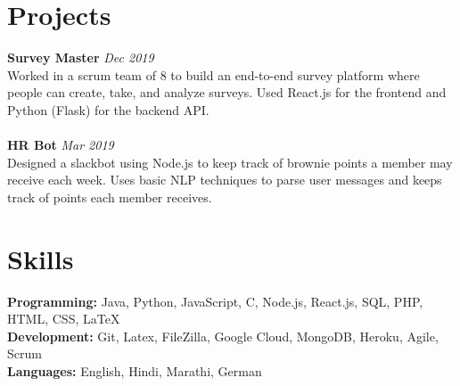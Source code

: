 \documentclass[margin,line]{resume}
\begin{document}
\begin{resume}
    \section{\mysidestyle Projects}

    \textbf{Survey Master} \hfill \textsl{Dec 2019}
    \\
    Worked in a scrum team of 8 to build an end-to-end survey platform where people can create, take, and analyze surveys. Used React.js for the frontend and Python (Flask) for the backend API.
    \\ \vspace{-1.5mm} \\
    \textbf{HR Bot} \hfill \textsl{Mar 2019}
    \\
    Designed a slackbot using Node.js to keep track of brownie points a member may receive each week. Uses basic NLP techniques to parse user messages and keeps track of points each member receives.

    \section{\mysidestyle Skills}

    \textbf{Programming:} Java, Python, JavaScript, C, Node.js, React.js, SQL, PHP, HTML, CSS, \LaTeX 
    \\
    \textbf{Development:} Git, Latex, FileZilla, Google Cloud, MongoDB, Heroku, Agile, Scrum
    \\
    \textbf{Languages:} English, Hindi, Marathi, German
\end{resume}
\end{document}
